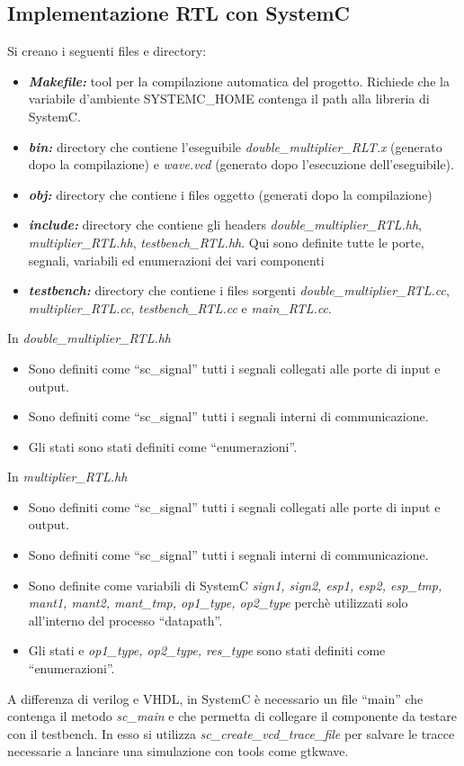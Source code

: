 \documentclass[]{IEEEtran}
\begin{document}
\subsection{Implementazione RTL con SystemC}
Si creano i seguenti files e directory:
\begin{itemize}
    \item {\it\bf Makefile:} tool per la compilazione automatica del progetto. Richiede che la variabile d'ambiente SYSTEMC\_HOME contenga il path alla libreria di SystemC.
    \item {\it\bf bin:} directory che contiene l'eseguibile {\it double\_multiplier\_RLT.x} (generato dopo la compilazione) e {\it wave.vcd} (generato dopo l'esecuzione dell'eseguibile).
    \item {\it\bf obj:} directory che contiene i files oggetto (generati dopo la compilazione)
    \item {\it\bf include:} directory che contiene gli headers {\it double\_multiplier\_RTL.hh}, {\it multiplier\_RTL.hh}, {\it testbench\_RTL.hh}. Qui sono definite tutte le porte, segnali, variabili ed enumerazioni dei vari componenti
    \item {\it\bf testbench:} directory che contiene i files sorgenti {\it double\_multiplier\_RTL.cc}, {\it multiplier\_RTL.cc}, {\it testbench\_RTL.cc} e {\it main\_RTL.cc}.
\end{itemize}
In {\it double\_multiplier\_RTL.hh}
\begin{itemize}
    \item Sono definiti come ``sc\_signal'' tutti i segnali collegati alle porte di input e output.
    \item Sono definiti come ``sc\_signal'' tutti i segnali interni di communicazione.
    \item Gli stati sono stati definiti come ``enumerazioni''.
\end{itemize}
In {\it multiplier\_RTL.hh}
\begin{itemize}
    \item Sono definiti come ``sc\_signal'' tutti i segnali collegati alle porte di input e output.
    \item Sono definiti come ``sc\_signal'' tutti i segnali interni di communicazione.
    \item Sono definite come variabili di SystemC {\it sign1, sign2, esp1, esp2, esp\_tmp, mant1, mant2, mant\_tmp, op1\_type, op2\_type} perchè utilizzati solo all'interno del processo ``datapath''.
    \item Gli stati e {\it op1\_type, op2\_type, res\_type} sono stati definiti come ``enumerazioni''.
\end{itemize}
A differenza di verilog e VHDL, in SystemC è necessario un file ``main'' che contenga il metodo {\it sc\_main} e che permetta di collegare il componente da testare con il testbench. In esso si utilizza {\it sc\_create\_vcd\_trace\_file} per salvare le tracce necessarie a lanciare una simulazione con tools come gtkwave.
\end{document}

